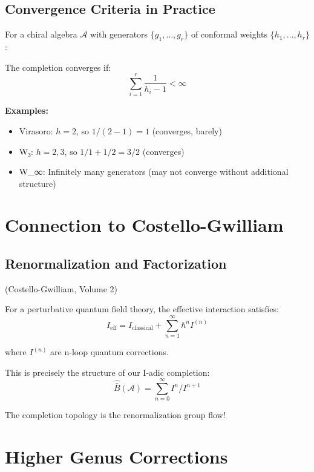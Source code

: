 \subsection{Convergence Criteria in Practice}

\begin{proposition}\label{prop:practical-convergence}
For a chiral algebra $\mathcal{A}$ with generators $\{g_1, \ldots, g_r\}$ of conformal weights $\{h_1, \ldots, h_r\}$:

The completion converges if:
$$\sum_{i=1}^r \frac{1}{h_i - 1} < \infty$$

\textbf{Examples:}
\begin{itemize}
\item Virasoro: $h = 2$, so $1/(2-1) = 1$ (converges, barely)
\item W₃: $h = 2, 3$, so $1/1 + 1/2 = 3/2$ (converges)
\item W_∞: Infinitely many generators (may not converge without additional structure)
\end{itemize}
\end{proposition}

\section{Connection to Costello-Gwilliam}

\subsection{Renormalization and Factorization}

\begin{theorem}\label{thm:CG-renorm}
\textup{(Costello-Gwilliam, Volume 2)}

For a perturbative quantum field theory, the effective interaction satisfies:
$$I_{\text{eff}} = I_{\text{classical}} + \sum_{n=1}^{\infty} \hbar^n I^{(n)}$$

where $I^{(n)}$ are n-loop quantum corrections.

This is precisely the structure of our I-adic completion:
$$\widehat{\bar{B}}(\mathcal{A}) = \sum_{n=0}^{\infty} I^n/I^{n+1}$$

The completion topology is the renormalization group flow!
\end{theorem}

\section{Higher Genus Corrections}

